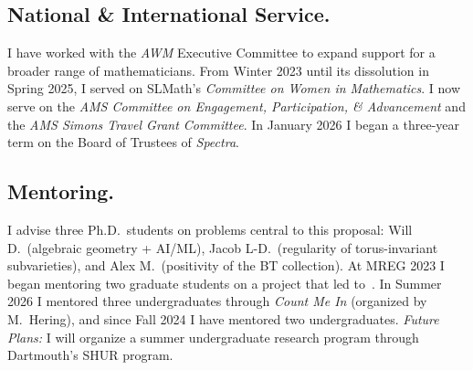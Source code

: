 \documentclass[11pt,reqno]{amsart}
\theoremstyle{remark}
\begin{document}
\subsection{National \& International Service.} I have worked with the \textit{AWM} Executive Committee to expand support for a broader range of mathematicians. From Winter 2023 until its dissolution in Spring 2025, I served on SLMath's \textit{Committee on Women in Mathematics}. I now serve on the \textit{AMS Committee on Engagement, Participation, \& Advancement} and the \textit{AMS Simons Travel Grant Committee}. In January 2026 I began a three-year term on the Board of Trustees of \textit{Spectra}.

\subsection{Mentoring.} I advise three Ph.D.\ students on problems central to this proposal: Will D.\ (algebraic geometry + AI/ML), Jacob L-D.\ (regularity of torus-invariant subvarieties), and Alex M.\ (positivity of the BT collection). At MREG 2023 I began mentoring two graduate students on a project that led to~\cite{BBZ26}. In Summer 2026 I mentored three undergraduates through \textit{Count Me In} (organized by M.~Hering), and since Fall 2024 I have mentored two undergraduates. \emph{Future Plans:} I will organize a summer undergraduate research program through Dartmouth's SHUR program.

\newpage
\renewcommand{\bibliofont}{\normalsize}


\end{document}

